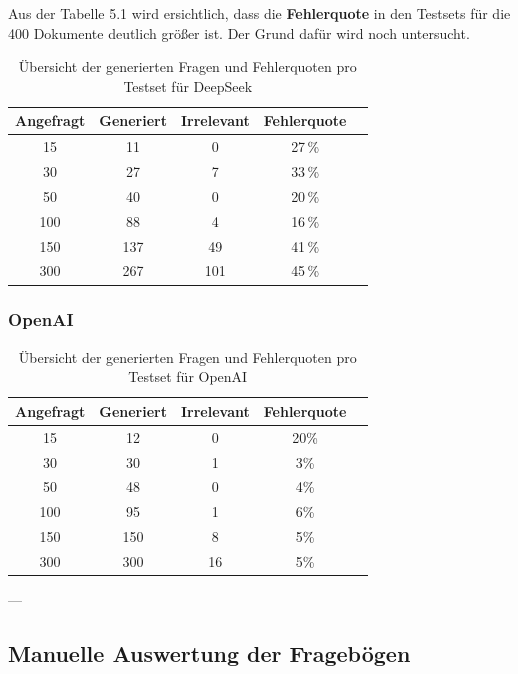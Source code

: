 Aus der Tabelle 5.1 wird ersichtlich, dass die \textbf{Fehlerquote} in den Testsets für die 400 Dokumente deutlich größer ist. Der Grund dafür wird noch untersucht.

\begin{table}[htbp]
    \centering
    \begin{tabular}{|c|c|c|c|c|}
        \hline
        \textbf{Angefragt} & \textbf{Generiert} & \textbf{Irrelevant} & \textbf{Fehlerquote} \\
        \hline
        15   & 11  & 0   & 27\,\% \\
        30   & 27  & 7   & 33\,\% \\
        50   & 40  & 0   & 20\,\% \\
        100  & 88  & 4   & 16\,\% \\
        150  & 137 & 49  & 41\,\% \\
        300  & 267 & 101 & 45\,\% \\
        \hline
    \end{tabular}
    \caption{Übersicht der generierten Fragen und Fehlerquoten pro Testset für DeepSeek}
\end{table}

\subsubsection{OpenAI}

\begin{table}[htbp]
    \centering
    \begin{tabular}{|c|c|c|c|c|}
        \hline
        \textbf{Angefragt} & \textbf{Generiert} & \textbf{Irrelevant} & \textbf{Fehlerquote} \\
        \hline
        15   & 12   & 0   & 20\% \\
        30   & 30   & 1   & 3\%  \\
        50   & 48   & 0   & 4\%  \\
        100  & 95   & 1   & 6\%  \\
        150  & 150  & 8   & 5\%  \\
        300  & 300  & 16  & 5\%  \\
        \hline
    \end{tabular}
    \caption{Übersicht der generierten Fragen und Fehlerquoten pro Testset für OpenAI}
\end{table}

---

\subsection{Manuelle Auswertung der Fragebögen}
